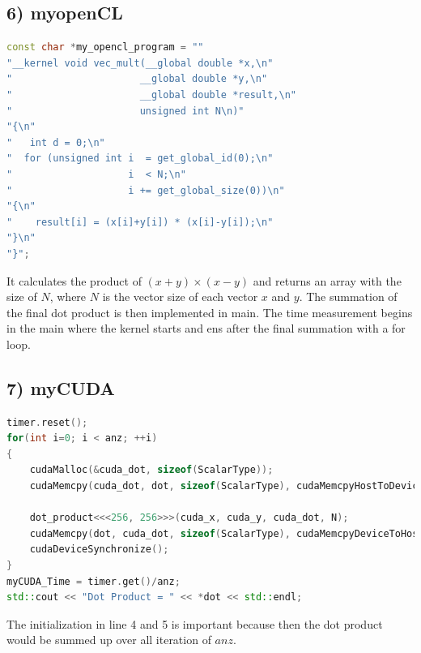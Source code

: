 \documentclass[11pt,a4paper]{article}
\begin{document}
\subsection*{6) myopenCL}
\begin{lstlisting}[language=C++, caption={myopenCL kernel}]
    const char *my_opencl_program = ""
"__kernel void vec_mult(__global double *x,\n"
"                      __global double *y,\n"
"                      __global double *result,\n"
"                      unsigned int N\n)"
"{\n"
"   int d = 0;\n"
"  for (unsigned int i  = get_global_id(0);\n"
"                    i  < N;\n"
"                    i += get_global_size(0))\n"
"{\n"
"    result[i] = (x[i]+y[i]) * (x[i]-y[i]);\n"
"}\n"
"}";
\end{lstlisting}
It calculates the product of $(x+y) \times (x-y)$ and returns an array with the size of $N$, where $N$ is the vector size of each vector $x$ and $y$. The summation of the final dot product is then implemented in main. The time measurement begins in the main where the kernel starts and ens after the final summation with a for loop.
\subsection*{7) myCUDA}
\begin{lstlisting}[language=C++, caption={myCUDA benchmark}]
timer.reset();
for(int i=0; i < anz; ++i) 
{
	cudaMalloc(&cuda_dot, sizeof(ScalarType));
	cudaMemcpy(cuda_dot, dot, sizeof(ScalarType), cudaMemcpyHostToDevice);
	
	dot_product<<<256, 256>>>(cuda_x, cuda_y, cuda_dot, N);
	cudaMemcpy(dot, cuda_dot, sizeof(ScalarType), cudaMemcpyDeviceToHost);  
	cudaDeviceSynchronize();   
}
myCUDA_Time = timer.get()/anz;
std::cout << "Dot Product = " << *dot << std::endl;
\end{lstlisting}
The initialization in line 4 and 5 is important because then the dot product would be summed up over all iteration of $anz$.
\newpage
\end{document}
